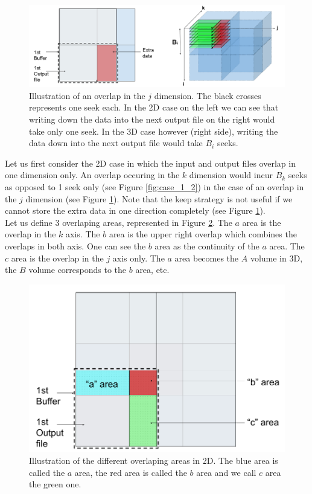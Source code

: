 \documentclass[conference]{IEEEtran}
\begin{document}
\begin{figure}[h]
\centering
\includegraphics[scale=0.20]{./figures/case_2_1.png}
\caption{Illustration of an overlap in the $j$ dimension. The black crosses represents one seek each. In the 2D case on the left we can see that writing down the data into the next output file on the right would take only one seek. In the 3D case however (right side), writing the data down into the next output file would take $B_i$ seeks.
}
\label{fig:case_2_1}
\end{figure}

Let us first consider the 2D case in which the input and output files overlap in one dimension only.
An overlap occuring in the $k$ dimension would incur $B_k$ seeks as opposed to 1 seek only (see Figure \ref{fig:case_1_2}) in the case of an overlap in the $j$ dimension (see Figure \ref{fig:case_2_1}).
Note that the keep strategy is not useful if we cannot store the extra data in one direction completely (see Figure \ref{fig:case_2_1}). \\

Let us define 3 overlaping areas, represented in Figure \ref{fig:areasabc}.
The $a$ area is the overlap in the $k$ axis.
The $b$ area is the upper right overlap which combines the overlaps in both axis.
One can see the $b$ area as the continuity of the $a$ area.
The $c$ area is the overlap in the $j$ axis only.
The $a$ area becomes the $A$ volume in 3D, the $B$ volume corresponds to the $b$ area, etc. \\

\begin{figure}[h]
\centering
\includegraphics[scale=0.20]{./figures/areasabc.png}
\caption{Illustration of the different overlaping areas in 2D.
The blue area is called the $a$ area, the red area is called the $b$ area and we call $c$ area the green one.
}
\label{fig:areasabc}
\end{figure}
\end{document}
